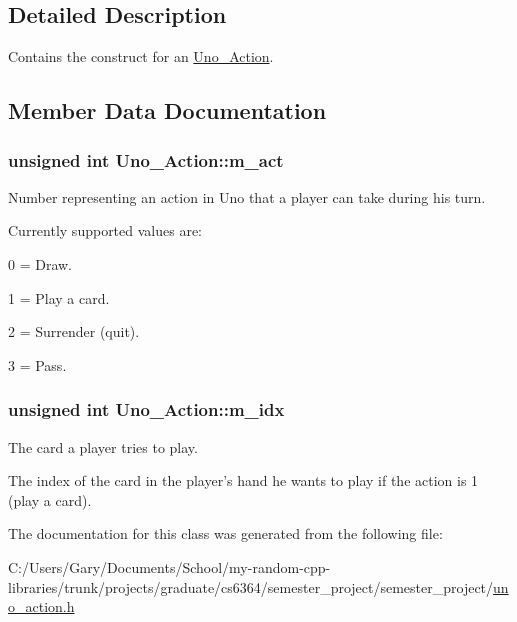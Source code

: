 \subsection{\-Detailed \-Description}
\-Contains the construct for an \hyperlink{class_uno___action}{\-Uno\-\_\-\-Action}. 

\subsection{\-Member \-Data \-Documentation}
\hypertarget{class_uno___action_a0e38e567ca993649d2513dd81c386677}{
\subsubsection[{m\-\_\-act}]{\setlength{\rightskip}{0pt plus 5cm}unsigned int {\bf \-Uno\-\_\-\-Action\-::m\-\_\-act}}}
\label{class_uno___action_a0e38e567ca993649d2513dd81c386677}


\-Number representing an action in \-Uno that a player can take during his turn. 

\-Currently supported values are\-: \begin{DoxyItemize}
\item 0 = \-Draw. \item 1 = \-Play a card. \item 2 = \-Surrender (quit). \item 3 = \-Pass. \end{DoxyItemize}
\hypertarget{class_uno___action_a228de2b5b030253562cadd34f21568c4}{
\subsubsection[{m\-\_\-idx}]{\setlength{\rightskip}{0pt plus 5cm}unsigned int {\bf \-Uno\-\_\-\-Action\-::m\-\_\-idx}}}
\label{class_uno___action_a228de2b5b030253562cadd34f21568c4}


\-The card a player tries to play. 

\-The index of the card in the player's hand he wants to play if the action is 1 (play a card). 

\-The documentation for this class was generated from the following file\-:\begin{DoxyCompactItemize}
\item 
\-C\-:/\-Users/\-Gary/\-Documents/\-School/my-\/random-\/cpp-\/libraries/trunk/projects/graduate/cs6364/semester\-\_\-project/semester\-\_\-project/\hyperlink{uno__action_8h}{uno\-\_\-action.\-h}\end{DoxyCompactItemize}

